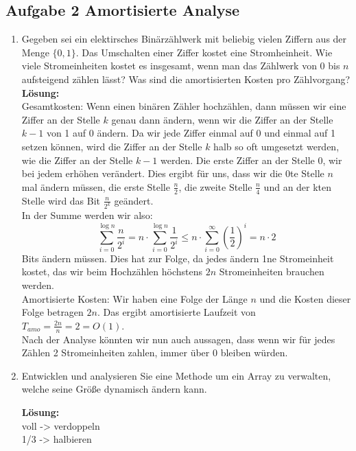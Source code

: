 \documentclass[11pt,a4paper,ngerman]{article}
\begin{document}
\subsection*{Aufgabe 2 \mdseries Amortisierte Analyse}

\begin{enumerate}[\bfseries a)]

\item Gegeben sei ein elektirsches Binärzählwerk mit beliebig vielen Ziffern aus der Menge $\{ 0, 1\}$. Das Umschalten einer Ziffer kostet eine Stromheinheit. Wie viele Stromeinheiten kostet es insgesamt, wenn man das Zählwerk von 0 bis $n$ aufsteigend zählen lässt? Was sind die amortisierten Kosten pro Zählvorgang?\\

\textbf{Lösung:}\\
Gesamtkosten: Wenn einen binären Zähler hochzählen, dann müssen wir eine Ziffer an der Stelle $k$ genau dann ändern, wenn wir die Ziffer an der Stelle $k-1$ von 1 auf 0 ändern. Da wir jede Ziffer einmal auf 0 und einmal auf 1 setzen können, wird die Ziffer an der Stelle $k$ halb so oft umgesetzt werden, wie die Ziffer an der Stelle $k-1$ werden. Die erste Ziffer an der Stelle 0, wir bei jedem erhöhen verändert. Dies ergibt für uns, dass wir die 0te Stelle $n$ mal ändern müssen, die erste Stelle $\frac{n}{2}$, die zweite Stelle $\frac{n}{4}$ und an der kten Stelle wird das Bit $\frac{n}{2^k}$ geändert.\\

In der Summe werden wir also:
$$
\sum_{i=0}^{\log n} \frac{n}{2^i} = n \cdot \sum_{i=0}^{\log n} \frac{1}{2^i} \leq n \cdot \sum_{i=0}^{\infty} \left( \frac{1}{2} \right)^i = n\cdot 2
$$
Bits ändern müssen. Dies hat zur Folge, da jedes ändern 1ne Stromeinheit kostet, das wir beim Hochzählen höchstens $2n$ Stromeinheiten brauchen werden.\\

Amortisierte Kosten: Wir haben eine Folge der Länge $n$ und die Kosten dieser Folge betragen $2n$. Das ergibt amortisierte Laufzeit von $T_{amo} = \frac{2n}{n} = 2 = O(1)$.\\

Nach der Analyse könnten wir nun auch aussagen, dass wenn wir für jedes Zählen 2 Stromeinheiten zahlen, immer über 0 bleiben würden.

\item Entwicklen und analysieren Sie eine Methode um ein Array zu verwalten, welche seine Größe dynamisch ändern kann.

\textbf{Lösung:}\\

voll -> verdoppeln\\
1/3 -> halbieren

\end{enumerate}
\end{document}
